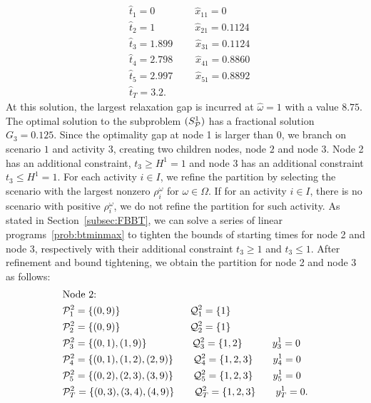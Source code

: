 \documentclass[11pt]{article}
\newcommand{\cQ}{{\cal Q}}
\newcommand{\cP}{{\cal P}}
\begin{document}
	\begin{align*}
	& \hat{t}_1 = 0 \qquad \qquad \hat{x}_{11} = 0\\
	& \hat{t}_2 = 1 \qquad \qquad \hat{x}_{21} = 0.1124\\
	& \hat{t}_3 = 1.899 \qquad \; \hat{x}_{31} = 0.1124\\
	& \hat{t}_4 = 2.798 \qquad \; \hat{x}_{41} = 0.8860\\
	& \hat{t}_5 = 2.997 \qquad \; \hat{x}_{51} = 0.8892\\
	& \hat{t}_T = 3.2.
	\end{align*}
	At this solution, the largest relaxation gap is incurred at \(\hat{\omega} = 1\) with a value \(8.75\). The optimal solution to the subproblem \((S^1_\cP)\) has a fractional solution \(G_3 = 0.125\). Since the optimality gap at node 1 is larger than 0, we branch on scenario \(1\) and activity \(3\), creating two children nodes, node \(2\) and node \(3\). Node 2 has an additional constraint, \(t_3 \geq H^1 = 1\) and node 3 has an additional constraint \(t_3 \leq H^1 = 1\). For each activity \(i \in I\), we refine the partition by selecting the scenario with the largest nonzero \(\rho_i^\omega\) for \(\omega \in \Omega\). If for an activity \(i \in I\), there is no scenario with positive \(\rho_i^\omega\), we do not refine the partition for such activity. As stated in Section~\ref{subsec:FBBT}, we can solve a series of linear programs~\eqref{prob:btminmax} to tighten the bounds of starting times for node 2 and node 3, respectively with their additional constraint \(t_3 \geq 1\) and \(t_3 \leq 1\). After refinement and bound tightening, we obtain the partition for node 2 and node 3 as follows:
	\begin{align*}
	& \text{Node 2:}\\
	&\cP_1^2 = \{(0,9)\} \qquad \qquad \qquad \quad \cQ_1^2 = \{1\}\\
	&\cP_2^2 = \{(0,9)\} \qquad \qquad \qquad \quad \cQ_2^2 = \{1\}\\
	&\cP_3^2 = \{(0,1),(1,9)\} \qquad \qquad \;\; \cQ_3^2 = \{1,2\} \qquad \quad  y_3^1 = 0\\
	&\cP_4^2 = \{(0,1),(1,2),(2,9)\} \qquad  \cQ_4^2 = \{1,2,3\} \qquad y_4^1 = 0\\
	&\cP_5^2 = \{(0,2),(2,3),(3,9)\} \qquad  \cQ_5^2 = \{1,2,3\} \qquad y_5^1 = 0\\
	&\cP_T^2 = \{(0,3),(3,4),(4,9)\} \qquad  \cQ_T^2 = \{1,2,3\} \qquad y_T^1 = 0.
	\end{align*}
\end{document}
